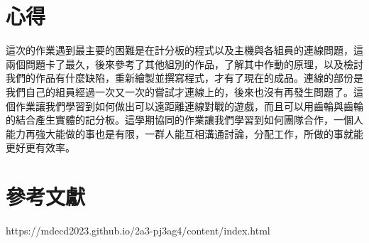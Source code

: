 \chapter{心得}
這次的作業遇到最主要的困難是在計分板的程式以及主機與各組員的連線問題，這兩個問題卡了最久，後來參考了其他組別的作品，了解其中作動的原理，以及檢討我們的作品有什麼缺陷，重新繪製並撰寫程式，才有了現在的成品。連線的部份是我們自己的組員經過一次又一次的嘗試才連線上的，後來也沒有再發生問題了。這個作業讓我們學習到如何做出可以遠距離連線對戰的遊戲，而且可以用齒輪與齒輪的結合產生實體的記分板。這學期協同的作業讓我們學習到如何團隊合作，一個人能力再強大能做的事也是有限，一群人能互相溝通討論，分配工作，所做的事就能更好更有效率。\\
\newpage

\chapter{參考文獻}
https://mdecd2023.github.io/2a3-pj3ag4/content/index.html\\
\newpage
